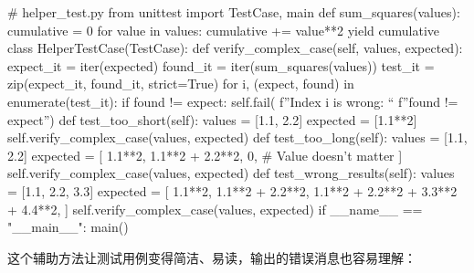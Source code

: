 \begin{codebox}[python]
# helper_test.py
from unittest import TestCase, main
def sum_squares(values):
    cumulative = 0
    for value in values:
        cumulative += value**2
        yield cumulative
class HelperTestCase(TestCase):
    def verify_complex_case(self, values, expected):
        expect_it = iter(expected)
        found_it = iter(sum_squares(values))
        test_it = zip(expect_it, found_it, strict=True)
        for i, (expect, found) in enumerate(test_it):
            if found != expect:
                self.fail( f”Index {i} is wrong: “
f”{found} != {expect}”)
    def test_too_short(self):
        values = [1.1, 2.2]
        expected = [1.1**2]
        self.verify_complex_case(values, expected)
    def test_too_long(self):
        values = [1.1, 2.2]
        expected = [
            1.1**2,
            1.1**2 + 2.2**2,
            0,  # Value doesn't matter
        ]
        self.verify_complex_case(values, expected)
    def test_wrong_results(self):
        values = [1.1, 2.2, 3.3]
        expected = [
            1.1**2,
            1.1**2 + 2.2**2,
            1.1**2 + 2.2**2 + 3.3**2 + 4.4**2,
        ]
        self.verify_complex_case(values, expected)
if __name__ == "__main__":
    main()
\end{codebox}

这个辅助方法让测试用例变得简洁、易读，输出的错误消息也容易理解：

